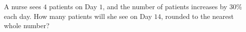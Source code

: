 A nurse sees $4$ patients on Day $1$, and the number of patients increases by $30\%$ each day. How many patients will she see on Day $14$, rounded to the nearest whole number?
